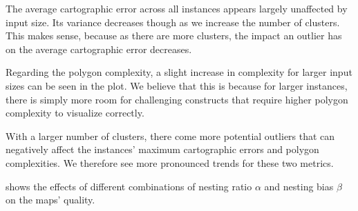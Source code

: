 The average cartographic error across all instances appears largely unaffected by input size.
Its variance decreases though as we increase the number of clusters.
This makes sense, because as there are more clusters, the impact an outlier has on the average cartographic error decreases.

Regarding the polygon complexity, a slight increase in complexity for larger input sizes can be seen in the plot.
We believe that this is because for larger instances, there is simply more room for challenging constructs that require higher polygon complexity to visualize correctly.

With a larger number of clusters, there come more potential outliers that can negatively affect the instances' maximum cartographic errors and polygon complexities.
We therefore see more pronounced trends for these two metrics.

\clearpage

 shows the effects of different combinations of nesting ratio $\alpha$ and nesting bias $\beta$ on the maps' quality.

